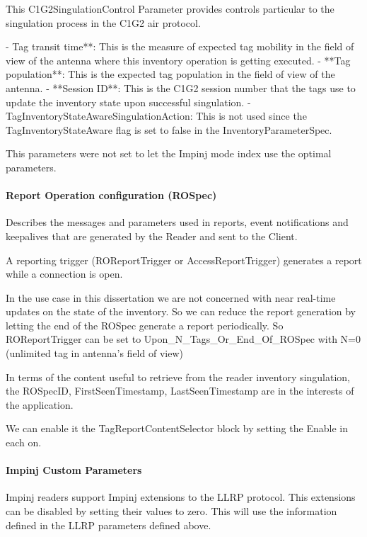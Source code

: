 This C1G2SingulationControl Parameter provides controls particular to the singulation process in the C1G2 air protocol.

- Tag transit time**: This is the measure of expected tag mobility in the field of view of the antenna where this inventory operation is getting executed.
- **Tag population**: This is the expected tag population in the field of view of the antenna.
- **Session ID**: This is the C1G2 session number that the tags use to update the inventory state upon successful singulation.
- TagInventoryStateAwareSingulationAction: This is not used since the TagInventoryStateAware flag is set to false in the InventoryParameterSpec.

This parameters were not set to let the Impinj mode index use the optimal parameters.

\paragraph{Report Operation configuration (ROSpec)}

Describes the messages and parameters used in reports, event notifications and keepalives that are generated by the Reader and sent to the Client.

A reporting trigger (ROReportTrigger or AccessReportTrigger) generates a report while a connection is open.

In the use case in this dissertation we are not concerned with near real-time updates on the state of the inventory. So we can reduce the report generation by letting the end of the ROSpec generate a report periodically.
So ROReportTrigger can be set to Upon_N_Tags_Or_End_Of_ROSpec with N=0 (unlimited tag in antenna's field of view)~\cite[sec. 14.2.1]{Llrp1standard20101013Pdf}

In terms of the content useful to retrieve from the reader inventory singulation, the ROSpecID, FirstSeenTimestamp, LastSeenTimestamp are in the interests of the application.

We can enable it the TagReportContentSelector block by setting the Enable in each on.

\paragraph{Impinj Custom Parameters}

Impinj readers support Impinj extensions to the LLRP protocol. This extensions can be disabled by setting their values to zero. This will use the information defined in the LLRP parameters defined above.

